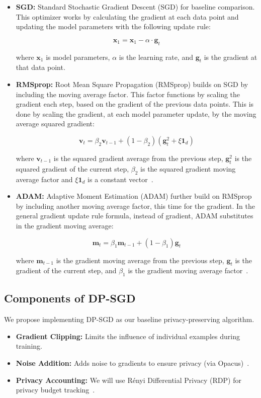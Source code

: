 \begin{itemize}
    \item \textbf{SGD:} Standard Stochastic Gradient Descent (SGD) for baseline comparison.
    This optimizer works by calculating the gradient at each data
    point and updating the model parameters with the following update rule:

    \[
        \mathbf{x}_1 = \mathbf{x}_1 - \alpha \cdot \mathbf{g}_t
    \]

    where $\mathbf{x}_1$ is model parameters, $\alpha$ is
    the learning rate, and $\mathbf{g}_t$ is the gradient at that data point.

    \item \textbf{RMSprop:} Root Mean Square Propagation (RMSprop) builds on SGD by including the moving average factor.
    This factor functions by scaling the gradient
    each step, based on the gradient of the previous data points.
    This is done by scaling the gradient, at each model parameter update,
    by the moving average squared gradient:

    \[
        \mathbf{v}_t = \beta_2 \mathbf{v}_{t-1} + (1 - \beta_2)(\mathbf{g}_t^2 + \xi \mathbf{1}_d)
    \]

    where $\mathbf{v}_{t-1}$ is the squared gradient average from the previous step, $\mathbf{g}_t^2 $ is
    the squared gradient of the current step, $\beta_2$ is the squared gradient moving average factor
    and $\xi \mathbf{1}_d$ is a constant vector~\cite{DBLP:journals/corr/abs-1807-06766,Jason_Huang_2020}.

    \item \textbf{ADAM:} Adaptive Moment Estimation (ADAM) further build on RMSprop by including another moving average factor, this time for the gradient.
    In the general gradient update rule formula, instead of gradient,
    ADAM substitutes in the gradient moving average:

    \[
        \mathbf{m}_t = \beta_1 \mathbf{m}_{t-1} + (1 - \beta_1) \mathbf{g}_t
    \]

    where $\mathbf{m}_{t-1}$ is the gradient moving average from the previous step, $\mathbf{g}_t$ is
    the gradient of the current step, and $\beta_1$ is the gradient moving average factor~\cite{DBLP:journals/corr/abs-1807-06766}.

\end{itemize}

\subsection{Components of DP-SGD}\label{subsec:components-of-dp-sgd}
We propose implementing DP-SGD as our baseline privacy-preserving algorithm.
\begin{itemize}
    \item \textbf{Gradient Clipping:} Limits the influence of individual examples during training.
    \item \textbf{Noise Addition:} Adds noise to gradients to ensure privacy (via Opacus)~\cite{opacus}.
    \item \textbf{Privacy Accounting:} We will use Rényi Differential Privacy (RDP) for privacy budget tracking~\cite{Mironov_2017_RenyiDP}.
\end{itemize}

